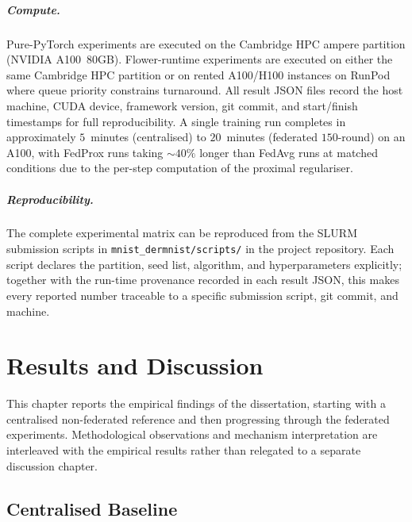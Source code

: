 \documentclass[11pt,a4paper]{report}
\begin{document}
\paragraph{Compute.}
Pure-PyTorch experiments are executed on the Cambridge HPC
ampere partition (NVIDIA A100~80GB). Flower-runtime
experiments are executed on either the same Cambridge HPC
partition or on rented A100/H100 instances on RunPod where
queue priority constrains turnaround. All result JSON files
record the host machine, CUDA device, framework version, git
commit, and start/finish timestamps for full reproducibility.
A single training run completes in approximately $5$~minutes
(centralised) to $20$~minutes (federated $150$-round) on an
A100, with FedProx runs taking $\sim 40\%$ longer than FedAvg
runs at matched conditions due to the per-step computation of
the proximal regulariser.

\paragraph{Reproducibility.}
The complete experimental matrix can be reproduced from the
SLURM submission scripts in \texttt{mnist\_dermnist/scripts/}
in the project repository. Each script declares the partition,
seed list, algorithm, and hyperparameters explicitly; together
with the run-time provenance recorded in each result JSON,
this makes every reported number traceable to a specific
submission script, git commit, and machine.

\chapter{Results and Discussion}
\label{ch:results}

This chapter reports the empirical findings of the dissertation,
starting with a centralised non-federated reference and then
progressing through the federated experiments. Methodological
observations and mechanism interpretation are interleaved with the
empirical results rather than relegated to a separate discussion
chapter.

\section{Centralised Baseline}
\label{sec:centralised-baseline}
\end{document}
